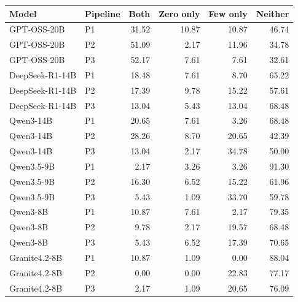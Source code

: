 \begin{tabularx}{\textwidth}{lXrrrr}
\toprule
Model & Pipeline & Both & Zero only & Few only & Neither \\
\midrule
GPT-OSS-20B & P1 & 31.52 & 10.87 & 10.87 & 46.74 \\
GPT-OSS-20B & P2 & 51.09 & 2.17 & 11.96 & 34.78 \\
GPT-OSS-20B & P3 & 52.17 & 7.61 & 7.61 & 32.61 \\
DeepSeek-R1-14B & P1 & 18.48 & 7.61 & 8.70 & 65.22 \\
DeepSeek-R1-14B & P2 & 17.39 & 9.78 & 15.22 & 57.61 \\
DeepSeek-R1-14B & P3 & 13.04 & 5.43 & 13.04 & 68.48 \\
Qwen3-14B & P1 & 20.65 & 7.61 & 3.26 & 68.48 \\
Qwen3-14B & P2 & 28.26 & 8.70 & 20.65 & 42.39 \\
Qwen3-14B & P3 & 13.04 & 2.17 & 34.78 & 50.00 \\
Qwen3.5-9B & P1 & 2.17 & 3.26 & 3.26 & 91.30 \\
Qwen3.5-9B & P2 & 16.30 & 6.52 & 15.22 & 61.96 \\
Qwen3.5-9B & P3 & 5.43 & 1.09 & 33.70 & 59.78 \\
Qwen3-8B & P1 & 10.87 & 7.61 & 2.17 & 79.35 \\
Qwen3-8B & P2 & 9.78 & 2.17 & 19.57 & 68.48 \\
Qwen3-8B & P3 & 5.43 & 6.52 & 17.39 & 70.65 \\
Granite4.2-8B & P1 & 10.87 & 1.09 & 0.00 & 88.04 \\
Granite4.2-8B & P2 & 0.00 & 0.00 & 22.83 & 77.17 \\
Granite4.2-8B & P3 & 2.17 & 1.09 & 20.65 & 76.09 \\
\bottomrule
\end{tabularx}
